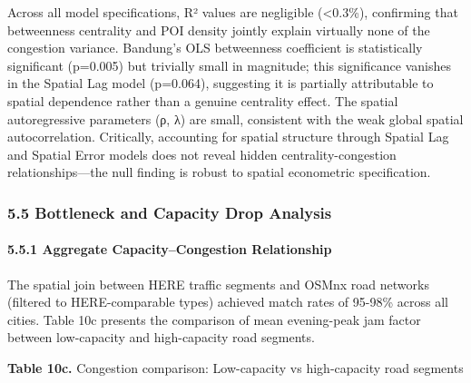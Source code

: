 Across all model specifications, R² values are negligible (\textless0.3\%), confirming that betweenness centrality and POI density jointly explain virtually none of the congestion variance. Bandung's OLS betweenness coefficient is statistically significant (p=0.005) but trivially small in magnitude; this significance vanishes in the Spatial Lag model (p=0.064), suggesting it is partially attributable to spatial dependence rather than a genuine centrality effect. The spatial autoregressive parameters (ρ, λ) are small, consistent with the weak global spatial autocorrelation. Critically, accounting for spatial structure through Spatial Lag and Spatial Error models does not reveal hidden centrality-congestion relationships---the null finding is robust to spatial econometric specification.

\subsubsection{5.5 Bottleneck and Capacity Drop Analysis}\label{bottleneck-and-capacity-drop-analysis-1}

\paragraph{5.5.1 Aggregate Capacity--Congestion Relationship}\label{aggregate-capacitycongestion-relationship}

The spatial join between HERE traffic segments and OSMnx road networks (filtered to HERE-comparable types) achieved match rates of 95-98\% across all cities. Table 10c presents the comparison of mean evening-peak jam factor between low-capacity and high-capacity road segments.

\textbf{Table 10c.} Congestion comparison: Low-capacity vs high-capacity road segments

